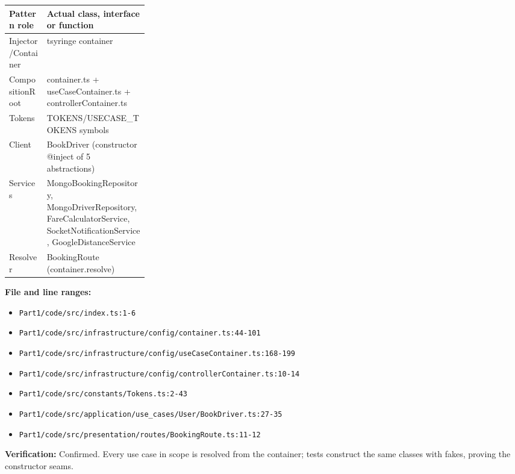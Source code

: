 \documentclass[11pt,a4paper]{article}
\begin{document}
\noindent\begin{tabularx}{\linewidth}{@{}P{0.27\linewidth}Y@{}}
\toprule Pattern role & Actual class, interface or function \\ \midrule
Injector/Container & tsyringe container \\
CompositionRoot & container.ts + useCaseContainer.ts + controllerContainer.ts \\
Tokens & TOKENS/USECASE\_TOKENS symbols \\
Client & BookDriver (constructor @inject of 5 abstractions) \\
Services & MongoBookingRepository, MongoDriverRepository, FareCalculatorService, SocketNotificationService, GoogleDistanceService \\
Resolver & BookingRoute (container.resolve) \\
\bottomrule
\end{tabularx}

\noindent\textbf{File and line ranges:}\begin{itemize}\setlength\itemsep{0pt}\item \texttt{Part1/\allowbreak{}code/\allowbreak{}src/\allowbreak{}index.\allowbreak{}ts:1-6}\item \texttt{Part1/\allowbreak{}code/\allowbreak{}src/\allowbreak{}infrastructure/\allowbreak{}config/\allowbreak{}container.\allowbreak{}ts:44-101}\item \texttt{Part1/\allowbreak{}code/\allowbreak{}src/\allowbreak{}infrastructure/\allowbreak{}config/\allowbreak{}useCaseContainer.\allowbreak{}ts:168-199}\item \texttt{Part1/\allowbreak{}code/\allowbreak{}src/\allowbreak{}infrastructure/\allowbreak{}config/\allowbreak{}controllerContainer.\allowbreak{}ts:10-14}\item \texttt{Part1/\allowbreak{}code/\allowbreak{}src/\allowbreak{}constants/\allowbreak{}Tokens.\allowbreak{}ts:2-43}\item \texttt{Part1/\allowbreak{}code/\allowbreak{}src/\allowbreak{}application/\allowbreak{}use\_\allowbreak{}cases/\allowbreak{}User/\allowbreak{}BookDriver.\allowbreak{}ts:27-35}\item \texttt{Part1/\allowbreak{}code/\allowbreak{}src/\allowbreak{}presentation/\allowbreak{}routes/\allowbreak{}BookingRoute.\allowbreak{}ts:11-12}\end{itemize}
\noindent\textbf{Verification:} Confirmed. Every use case in scope is resolved from the container; tests construct the same classes with fakes, proving the constructor seams.
\end{document}
